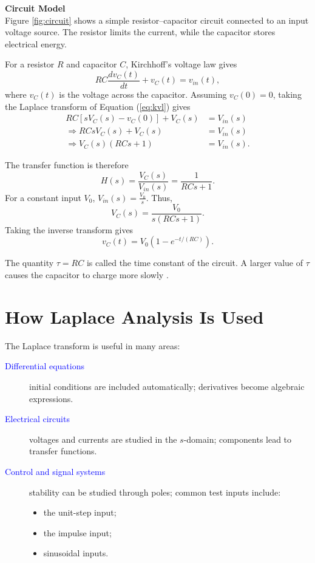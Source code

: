 \documentclass[11pt,a4paper]{article}
\begin{document}
\textbf{Circuit Model} \\
Figure \ref{fig:circuit} shows a simple resistor--capacitor circuit connected to an input voltage source. The resistor limits the current, while the capacitor stores electrical energy. 

For a resistor $R$ and capacitor $C$, Kirchhoff's voltage law gives
\begin{equation}
    RC\frac{dv_{C}(t)}{dt} + v_{C}(t) = v_{in}(t), \label{eq:kvl}
\end{equation}
where $v_{C}(t)$ is the voltage across the capacitor. Assuming $v_{C}(0)=0$, taking the Laplace transform of Equation (\ref{eq:kvl}) gives
\begin{align}
    RC[sV_{C}(s) - v_{C}(0)] + V_{C}(s) &= V_{in}(s) \nonumber \\
    \Rightarrow RCsV_{C}(s) + V_{C}(s) &= V_{in}(s) \nonumber \\
    \Rightarrow V_{C}(s)(RCs + 1) &= V_{in}(s). \label{eq:laplace_rc}
\end{align}

The transfer function is therefore
\begin{equation}
    H(s) = \frac{V_{C}(s)}{V_{in}(s)} = \frac{1}{RCs+1}.
\end{equation}
For a constant input $V_0$, $V_{in}(s) = \frac{V_0}{s}$. Thus,
\begin{equation}
    V_{C}(s) = \frac{V_0}{s(RCs+1)}.
\end{equation}
Taking the inverse transform gives
\begin{equation}
    v_{C}(t) = V_0(1 - e^{-t/(RC)}). \label{eq:time_domain}
\end{equation}

The quantity $\tau = RC$ is called the time constant of the circuit. A larger value of $\tau$ causes the capacitor to charge more slowly \cite{ogata}.

\section{How Laplace Analysis Is Used}

The Laplace transform is useful in many areas:
\begin{description}
    \item[\textcolor{blue}{Differential equations}] initial conditions are included automatically; derivatives become algebraic expressions.
    \item[\textcolor{blue}{Electrical circuits}] voltages and currents are studied in the $s$-domain; components lead to transfer functions.
    \item[\textcolor{blue}{Control and signal systems}] stability can be studied through poles; common test inputs include:
    \begin{itemize}
        \item the unit-step input;
        \item the impulse input;
        \item sinusoidal inputs.
    \end{itemize}
\end{description}
\end{document}
